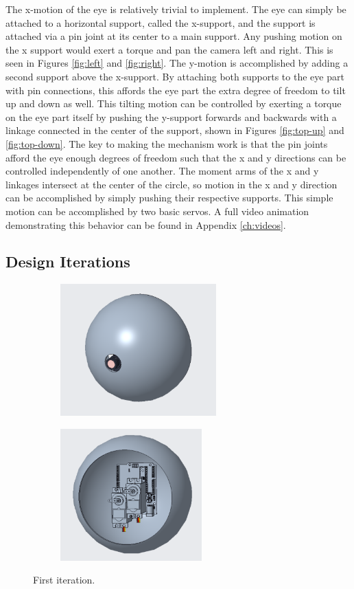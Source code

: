 The x-motion of the eye is relatively trivial to implement. The eye can simply be attached to a horizontal support, called the x-support, and the support is attached via a pin joint at its center to a main support. Any pushing motion on the x support would exert a torque and pan the camera left and right. This is seen in Figures \ref{fig:left} and \ref{fig:right}. The y-motion is accomplished by adding a second support above the x-support. By attaching both supports to the eye part with pin connections, this affords the eye part the extra degree of freedom to tilt up and down as well. This tilting motion can be controlled by exerting a torque on the eye part itself by pushing the y-support forwards and backwards with a linkage connected in the center of the support, shown in Figures \ref{fig:top-up} and \ref{fig:top-down}. The key to making the mechanism work is that the pin joints afford the eye enough degrees of freedom such that the x and y directions can be controlled independently of one another. The moment arms of the x and y linkages intersect at the center of the circle, so motion in the x and y direction can be accomplished by simply pushing their respective supports. This simple motion can be accomplished by two basic servos. A full video animation demonstrating this behavior can be found in Appendix \ref{ch:videos}.

\subsection{Design Iterations}
\label{ch:design-iterations}
\begin{figure}[h]
    \centering
    \begin{subfigure}{0.4\linewidth}
        \includegraphics[height=2in]{Thesis/ch2/first-iteration.png}
    \end{subfigure}
    \begin{subfigure}{0.4\linewidth}
        \includegraphics[height=2in]{Thesis/ch2/first-iteration-2.png}
    \end{subfigure}
    \caption{First iteration.}
    \label{fig:first-iteration}
\end{figure}

